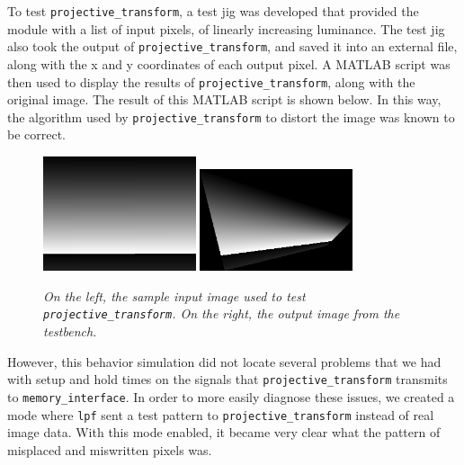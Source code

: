 \documentclass[10pt]{article}
\begin{document}
To test {\tt projective\_transform}, a test jig was developed that provided the module with a list of input pixels, of linearly increasing luminance. The test jig also took the output of {\tt projective\_transform}, and saved it into an external file, along with the x and y coordinates of each output pixel. A MATLAB script was then used to display the results of {\tt projective\_transform}, along with the original image. The result of this MATLAB script is shown below. In this way, the algorithm used by {\tt projective\_transform} to distort the image was known to be correct.

\begin{figure}[h!]
\centering
\includegraphics[width=0.4\textwidth]{images/original.png}
\includegraphics[width=0.4\textwidth]{images/output.png}
\caption{\emph{On the left, the sample input image used to test {\tt projective\_transform}. On the right, the output image from the testbench.}}
\end{figure}

However, this behavior simulation did not locate several problems that we had with setup and hold times on the signals that {\tt projective\_transform} transmits to {\tt memory\_interface}. In order to more easily diagnose these issues, we created a mode where {\tt lpf} sent a test pattern to {\tt projective\_transform} instead of real image data. With this mode enabled, it became very clear what the pattern of misplaced and miswritten pixels was.
\end{document}
